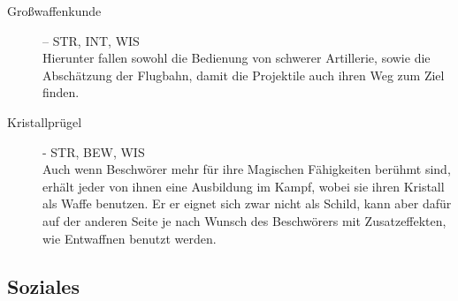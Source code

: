 \documentclass[a4paper,12pt,oneside]{book}
\begin{document}
\begin{description}
\item[Großwaffenkunde] – STR, INT, WIS
\\Hierunter fallen sowohl die Bedienung von schwerer Artillerie, sowie die Abschätzung der Flugbahn, damit die Projektile auch ihren Weg zum Ziel finden.
\item[Kristallprügel] - STR, BEW, WIS
\\Auch wenn Beschwörer mehr für ihre Magischen Fähigkeiten berühmt sind, erhält jeder von ihnen eine Ausbildung im Kampf, wobei sie ihren Kristall als Waffe benutzen. Er er eignet sich zwar nicht als Schild, kann aber dafür auf der anderen Seite je nach Wunsch des Beschwörers mit Zusatzeffekten, wie Entwaffnen benutzt werden. 
\end{description}
\subsection{Soziales}
\end{document}

